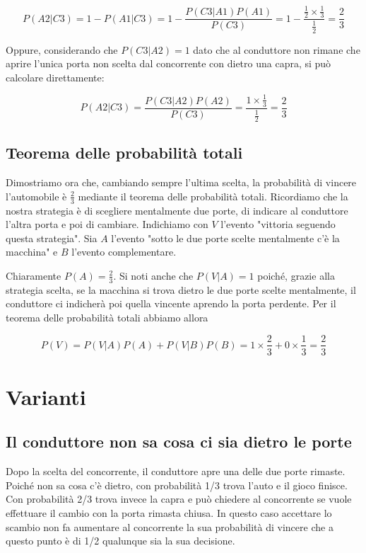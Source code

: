 \documentclass[a4paper, 12pt]{report}
\begin{document}
\begin{equation*}
	P(A2|C3) = 1 - P(A1|C3) = 1 - \frac{P(C3|A1)P(A1)}{P(C3)} = 1 - \frac{\frac{1}{2} \times \frac{1}{3}}{\frac{1}{2}} = \frac{2}{3}
\end{equation*}

Oppure, considerando che \(P(C3|A2)=1\) dato che al conduttore non rimane che aprire l'unica porta non scelta dal concorrente con dietro una capra, si può calcolare direttamente:

\begin{equation*}
	P(A2|C3) = \frac{P(C3|A2)P(A2)}{P(C3)} = \frac{1 \times \frac{1}{3}}{\frac{1}{2}} = \frac{2}{3}
\end{equation*}

\section{Teorema delle probabilità totali}
Dimostriamo ora che, cambiando sempre l'ultima scelta, la probabilità di vincere l'automobile è \(\frac{2}{3}\) mediante il teorema delle probabilità totali. Ricordiamo che la nostra strategia è di scegliere mentalmente due porte, di indicare al conduttore l'altra porta e poi di cambiare. Indichiamo con \(V\) l'evento "vittoria seguendo questa strategia". Sia \(A\) l'evento "sotto le due porte scelte mentalmente c'è la macchina" e \(B\) l'evento complementare.

Chiaramente \(P(A)=\frac {2}{3}\). Si noti anche che \(P(V|A) = 1\) poiché, grazie alla strategia scelta, se la macchina si trova dietro le due porte scelte mentalmente, il conduttore ci indicherà poi quella vincente aprendo la porta perdente. Per il teorema delle probabilità totali abbiamo allora

\begin{equation*}
	P(V) = P(V|A)P(A) + P(V|B)P(B) = 1 \times \frac{2}{3} + 0 \times \frac{1}{3} = \frac{2}{3}
\end{equation*}

\chapter{Varianti}
\section{Il conduttore non sa cosa ci sia dietro le porte}
Dopo la scelta del concorrente, il conduttore apre una delle due porte rimaste. Poiché non sa cosa c'è dietro, con probabilità 1/3 trova l'auto e il gioco finisce. Con probabilità 2/3 trova invece la capra e può chiedere al concorrente se vuole effettuare il cambio con la porta rimasta chiusa. In questo caso accettare lo scambio non fa aumentare al concorrente la sua probabilità di vincere che a questo punto è di 1/2 qualunque sia la sua decisione.
\end{document}

